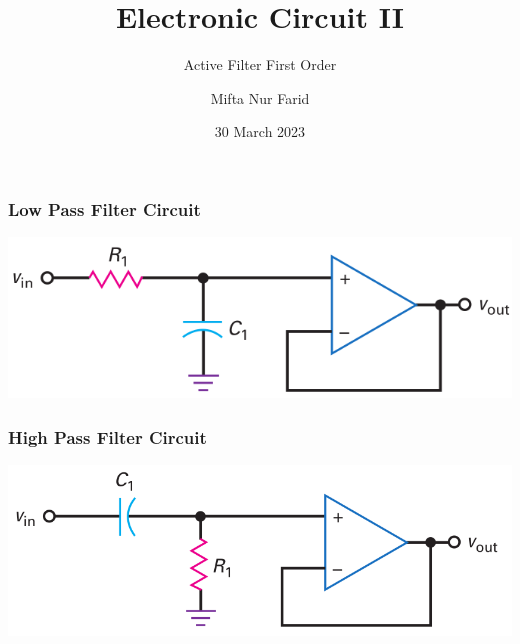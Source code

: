 \documentclass[pdflatex,compress]{beamer}
\title{Electronic Circuit II}
\subtitle{Active Filter First Order}
\author{Mifta Nur Farid}
\date{30 March 2023}
\begin{document}
\maketitle

\begin{frame}
	\frametitle{Low Pass Filter Circuit}
	\begin{center}
		\includegraphics[width=\linewidth]{img/img01}
	\end{center}
\end{frame}

\begin{frame}
	\frametitle{High Pass Filter Circuit}
	\begin{center}
		\includegraphics[width=\linewidth]{img/img02}
	\end{center}
\end{frame}
\end{document}
